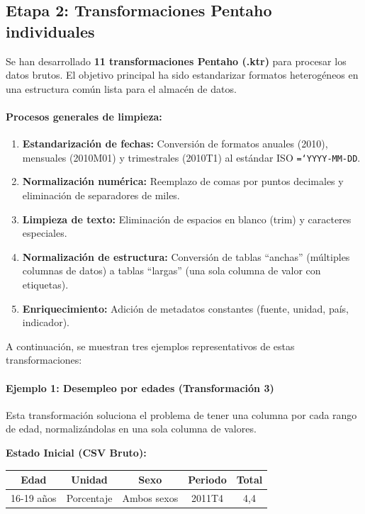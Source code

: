 \documentclass{article}
\let\oldtexttt\texttt  %
\renewcommand{\texttt}[1]{{\footnotesize\oldtexttt{\hyphenchar\font=`\-#1}}}  %
\begin{document}
\subsection{Etapa 2: Transformaciones Pentaho individuales}

Se han desarrollado \textbf{11 transformaciones Pentaho (.ktr)} para procesar los datos brutos. El objetivo principal ha sido estandarizar formatos heterog\'eneos en una estructura com\'un lista para el almac\'en de datos.

\paragraph{Procesos generales de limpieza:}
\begin{enumerate}
    \item \textbf{Estandarizaci\'on de fechas:} Conversi\'on de formatos anuales (2010), mensuales (2010M01) y trimestrales (2010T1) al est\'andar ISO \texttt{YYYY-MM-DD}.
    \item \textbf{Normalizaci\'on num\'erica:} Reemplazo de comas por puntos decimales y eliminaci\'on de separadores de miles.
    \item \textbf{Limpieza de texto:} Eliminaci\'on de espacios en blanco (trim) y caracteres especiales.
    \item \textbf{Normalizaci\'on de estructura:} Conversi\'on de tablas ``anchas'' (m\'ultiples columnas de datos) a tablas ``largas'' (una sola columna de valor con etiquetas).
    \item \textbf{Enriquecimiento:} Adici\'on de metadatos constantes (fuente, unidad, pa\'is, indicador).
\end{enumerate}

A continuaci\'on, se muestran tres ejemplos representativos de estas transformaciones:

\paragraph{Ejemplo 1: Desempleo por edades (Transformaci\'on 3)}
Esta transformaci\'on soluciona el problema de tener una columna por cada rango de edad, normaliz\'andolas en una sola columna de valores.

\textbf{Estado Inicial (CSV Bruto):}
\begin{table}[H]
\centering
\footnotesize
\begin{tabular*}{0.5\textwidth}{@{\extracolsep{\fill}}ccccc}
\toprule
Edad & Unidad & Sexo & Periodo & Total \\
\midrule
16-19 a\~nos & Porcentaje & Ambos sexos & 2011T4 & 4,4 \\
\bottomrule
\end{tabular*}
\end{table}
\end{document}
